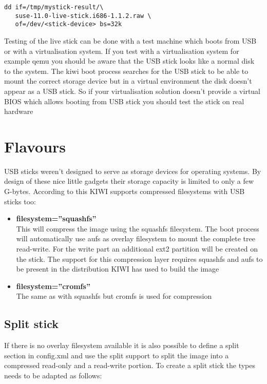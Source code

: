 \begin{Command}{13cm}
\begin{verbatim}
dd if=/tmp/mystick-result/\
   suse-11.0-live-stick.i686-1.1.2.raw \
   of=/dev/<stick-device> bs=32k
\end{verbatim}
\end{Command}

Testing of the live stick can be done with a test machine which boots from
USB or with a virtualisation system. If you test with a virtualisation
system for example qemu you should be aware that the USB stick looks like
a normal disk to the system. The kiwi boot process searches for the USB
stick to be able to mount the correct storage device but in a virtual
environment the disk doesn't appear as a USB stick. So if your
virtualisation solution doesn't provide a virtual BIOS which allows booting
from USB stick you should test the stick on real hardware

\section{Flavours}

USB sticks weren't designed to serve as storage devices for
operating systems. By design of these nice little gadgets their
storage capacity is limited to only a few G-bytes. According to
this KIWI supports compressed filesystems with USB sticks too:  

\begin{itemize}
\item \textbf{filesystem=''squashfs''}\\
      This will compress the image using the squashfs filesystem. The
      boot process will automatically use aufs as overlay filesystem to
      mount the complete tree read-write. For the write part an additional
      ext2 partition will be created on the stick. The support for this
      compression layer requires squashfs and aufs to be present in
      the distribution KIWI has used to build the image 
\item \textbf{filesystem=''cromfs''}\\
      The same as with squashfs but cromfs is used for compression
\end{itemize}

\subsection{Split stick}
If there is no overlay filesystem available it is also possible to
define a split section in config.xml and use the split support to
split the image into a compressed read-only and a read-write portion.
To create a split stick the types needs to be adapted as follows:

